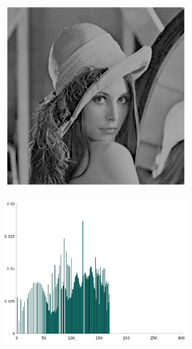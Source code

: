 \documentclass{article}
\begin{document}
\begin{figure}[H]
    \begin{subfigure}{0.5\textwidth}
        \includegraphics[width=0.9\textwidth]{especLena.png} %
    \end{subfigure}\hfill
    \begin{subfigure}{0.5\textwidth}
        \includegraphics[width=0.9\textwidth]{histoEspecLena.png} %
    \end{subfigure}
\end{figure}
\end{document}
